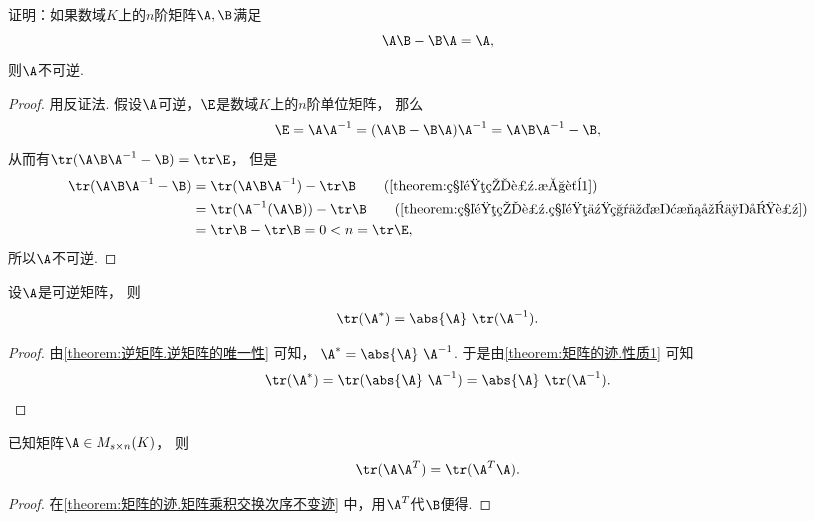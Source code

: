 \begin{example}
证明：如果数域\(K\)上的\(n\)阶矩阵\(\A,\B\)满足\[
	\A \B - \B \A=\A,
\]
则\(\A\)不可逆.
\begin{proof}
用反证法.
假设\(\A\)可逆，\(\E\)是数域\(K\)上的\(n\)阶单位矩阵，
那么\begin{gather*}
	\E = \A\A^{-1}
	= (\A \B - \B \A)\A^{-1} %
	= \A \B \A^{-1}-\B,
\end{gather*}
从而有\(\tr(\A \B \A^{-1}-\B) = \tr\E\)，
但是\begin{align*}
	\tr(\A \B \A^{-1}-\B)
	&= \tr(\A \B \A^{-1})-\tr\B
		\tag{\cref{theorem:矩阵的迹.性质1}} \\
	&= \tr(\A^{-1}(\A \B))-\tr\B
		\tag{\cref{theorem:矩阵的迹.矩阵乘积交换次序不变迹}} \\
	&= \tr\B-\tr\B
	= 0
	< n = \tr\E,
\end{align*}
所以\(\A\)不可逆.
\end{proof}
\end{example}

\begin{property}
设\(\A\)是可逆矩阵，
则\begin{equation}
	\tr(\A^*) = \abs{\A}~\tr(\A^{-1}).
\end{equation}
\begin{proof}
由\cref{theorem:逆矩阵.逆矩阵的唯一性} 可知，
\(\A^* = \abs{\A}~\A^{-1}\).
于是由\cref{theorem:矩阵的迹.性质1} 可知\[
	\tr(\A^*) = \tr(\abs{\A}~\A^{-1}) = \abs{\A}~\tr(\A^{-1}).
	\qedhere
\]
\end{proof}
\end{property}

\begin{property}
已知矩阵\(\A \in M_{s \times n}(K)\)，
则\begin{equation}
	\tr(\A\A^T) = \tr(\A^T\A).
\end{equation}
\begin{proof}
在\cref{theorem:矩阵的迹.矩阵乘积交换次序不变迹} 中，用\(\A^T\)代\(\B\)便得.
\end{proof}
\end{property}

